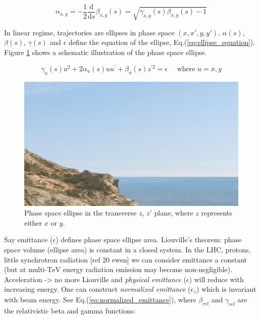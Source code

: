 \begin{equation}
    \alpha_{x, y} = -\frac{1}{2} \frac{\mathrm{d}}{\mathrm{d}s} \beta_{x, y}(s) = \sqrt{\gamma_{x, y}(s) \beta_{x, y}(s) - 1}
    \label{eq:alpha_function}
\end{equation}
\bigbreak

In linear regime, trajectories are ellipses in phase space $(x, x\prime, y, y\prime)$.
$\alpha(s)$, $\beta(s)$, $\gamma(s)$ and $\epsilon$ define the equation of the ellipse, Eq.(\ref{eq:ellipse_equation}).
Figure \ref{fig:phase_space_ellipse} shows a schematic illustration of the phase space ellipse.
\bigbreak

\begin{equation}
    \gamma_{u}(s) u^{2} + 2 \alpha_{u}(s) u u^{\prime} + \beta_{u}(s) z^{\prime 2} = \epsilon \quad \text { where } u = x, y
    \label{eq:ellipse_equation}
\end{equation}
\bigbreak

\begin{figure}[!htb]
    \begin{center}
    \includegraphics[width = 0.85\linewidth]{Figures/placeholder.png}
    \caption{Phase space ellipse in the transverse $z$, $z\prime$ plane, where $z$ represents either $x$ or $y$.}
    \label{fig:phase_space_ellipse}
    \end{center}
\end{figure}

Say emittance ($\epsilon$) defines phase space ellipse area.
Liouville's theorem: phase space volume (ellipse area) is constant in a closed system.
In the LHC, protons, little synchrotron radiation [ref 20 ewen] we can consider emittance a constant (but at multi-$\mathrm{TeV}$ energy radiation emission may become non-negligible).
Acceleration -> no more Liouville and \emph{physical emittance} ($\epsilon$) will reduce with increasing energy.
One can construct \emph{normalized emittance} ($\epsilon_{\gamma}$) which is invariant with beam energy.
See Eq.(\ref{eq:normalized_emittance}), where $\beta_{rel}$ and $\gamma_{rel}$ are the relativistic beta and gamma functions:
\bigbreak

